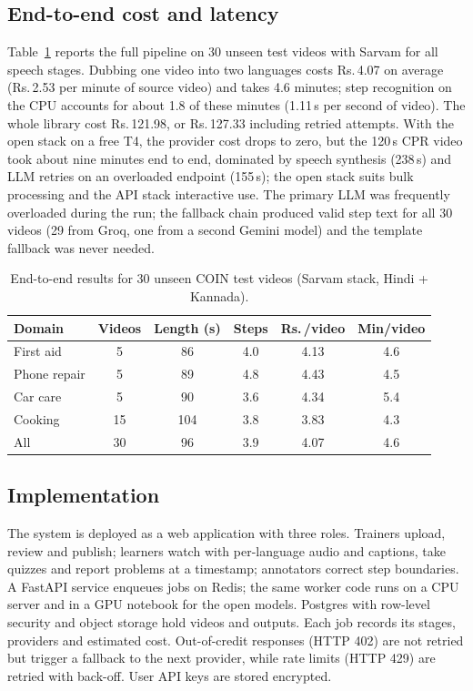 \documentclass[conference]{IEEEtran}
\newcommand{\rup}{Rs.\,}
\begin{document}
\subsection{End-to-end cost and latency}
Table~\ref{tab:cost} reports the full pipeline on 30 unseen test videos with Sarvam for all speech stages. Dubbing one
video into two languages costs \rup4.07 on average (\rup2.53 per minute of source video) and takes 4.6 minutes; step recognition on the CPU accounts for about 1.8 of these minutes
(1.11\,s per second of video). The whole library cost \rup121.98, or \rup127.33 including
retried attempts. With the open stack on a free T4, the provider cost drops to zero, but the 120\,s CPR video took about
nine minutes end to end, dominated by speech synthesis (238\,s) and LLM retries on an overloaded endpoint (155\,s);
the open stack suits bulk processing and the API stack interactive use. The primary LLM was frequently overloaded during
the run; the fallback chain produced valid step text for all 30 videos (29 from Groq, one from a second Gemini model) and
the template fallback was never needed.

\begin{table}[t]
\centering
\caption{End-to-end results for 30 unseen COIN test videos (Sarvam stack, Hindi + Kannada).}
\label{tab:cost}
\setlength{\tabcolsep}{3.5pt}
\begin{tabular}{@{}lccccc@{}}
\toprule
Domain & Videos & Length (s) & Steps & \rup/video & Min/video \\
\midrule
First aid & 5 & 86 & 4.0 & 4.13 & 4.6 \\
Phone repair & 5 & 89 & 4.8 & 4.43 & 4.5 \\
Car care & 5 & 90 & 3.6 & 4.34 & 5.4 \\
Cooking & 15 & 104 & 3.8 & 3.83 & 4.3 \\
\midrule
All & 30 & 96 & 3.9 & 4.07 & 4.6 \\
\bottomrule
\end{tabular}
\end{table}

\subsection{Implementation}
The system is deployed as a web application with three roles. Trainers upload, review and publish; learners watch with
per-language audio and captions, take quizzes and report problems at a timestamp; annotators correct step boundaries. A
FastAPI service enqueues jobs on Redis; the same worker code runs on a CPU server and in a GPU notebook for the open
models. Postgres with row-level security and object storage hold videos and outputs. Each job records its stages,
providers and estimated cost. Out-of-credit responses (HTTP 402) are not retried but trigger a fallback to the next
provider, while rate limits (HTTP 429) are retried with back-off. User API keys are stored encrypted.
\end{document}
